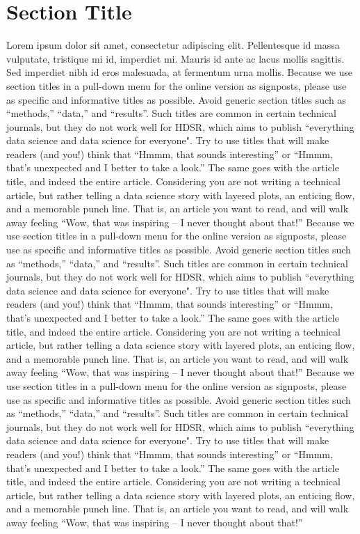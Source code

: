 \documentclass[]{hdsr}
\begin{document}
\section{Section Title}
Lorem ipsum dolor sit amet, consectetur adipiscing elit. Pellentesque id massa vulputate, tristique mi id, imperdiet mi. Mauris id ante ac lacus mollis sagittis. Sed imperdiet nibh id eros malesuada, at fermentum urna mollis. Because we use section titles in a pull-down menu for the online version as signposts, please use as specific and informative titles as possible. Avoid generic section titles such as ``methods,'' ``data,'' and ``results''. Such titles are common in certain technical journals, but they do not work well for HDSR, which aims to publish ``everything data science and data science for everyone". Try to use titles that will make readers (and you!) think that ``Hmmm, that sounds interesting'' or ``Hmmm, that's unexpected and I better to take a look.''   The same goes with the article title, and indeed the entire article.  Considering you are not writing a technical article, but rather telling a data science story with layered plots, an enticing flow, and a memorable punch line. That is, an article you want to read, and will walk away feeling ``Wow, that was inspiring -- I never thought about that!'' Because we use section titles in a pull-down menu for the online version as signposts, please use as specific and informative titles as possible. Avoid generic section titles such as ``methods,'' ``data,'' and ``results''. Such titles are common in certain technical journals, but they do not work well for HDSR, which aims to publish ``everything data science and data science for everyone". Try to use titles that will make readers (and you!) think that ``Hmmm, that sounds interesting'' or ``Hmmm, that's unexpected and I better to take a look.''   The same goes with the article title, and indeed the entire article.  Considering you are not writing a technical article, but rather telling a data science story with layered plots, an enticing flow, and a memorable punch line. That is, an article you want to read, and will walk away feeling ``Wow, that was inspiring -- I never thought about that!'' Because we use section titles in a pull-down menu for the online version as signposts, please use as specific and informative titles as possible. Avoid generic section titles such as ``methods,'' ``data,'' and ``results''. Such titles are common in certain technical journals, but they do not work well for HDSR, which aims to publish ``everything data science and data science for everyone". Try to use titles that will make readers (and you!) think that ``Hmmm, that sounds interesting'' or ``Hmmm, that's unexpected and I better to take a look.''   The same goes with the article title, and indeed the entire article.  Considering you are not writing a technical article, but rather telling a data science story with layered plots, an enticing flow, and a memorable punch line. That is, an article you want to read, and will walk away feeling ``Wow, that was inspiring -- I never thought about that!'' 
\end{document}
